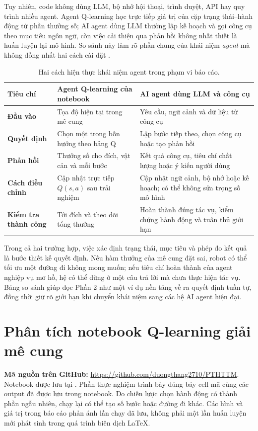 \documentclass[12pt,a4paper]{report}
\begin{document}
Tuy nhiên, code không dùng LLM, bộ nhớ hội thoại, trình duyệt, API hay quy trình
nhiều agent. Agent Q-learning học trực tiếp giá trị của cặp trạng thái--hành động từ
phần thưởng số; AI agent dùng LLM thường lập kế hoạch và gọi công cụ theo mục tiêu
ngôn ngữ, còn việc cải thiện qua phản hồi không nhất thiết là huấn luyện lại mô hình.
So sánh này làm rõ phần chung của khái niệm \emph{agent} mà không đồng nhất hai cách
cài đặt \cite{google,ibm,mckinsey}.

\begin{table}[H]
\centering
\small
\caption{Hai cách hiện thực khái niệm agent trong phạm vi báo cáo.}
\begin{tabularx}{\textwidth}{>{\bfseries}p{2.9cm}XX}
\toprule
Tiêu chí & Agent Q-learning của notebook & AI agent dùng LLM và công cụ \\
\midrule
Đầu vào & Tọa độ hiện tại trong mê cung & Yêu cầu, ngữ cảnh và dữ liệu từ công cụ \\
Quyết định & Chọn một trong bốn hướng theo bảng Q & Lập bước tiếp theo, chọn công cụ hoặc tạo phản hồi \\
Phản hồi & Thưởng số cho đích, vật cản và mỗi bước & Kết quả công cụ, tiêu chí chất lượng hoặc ý kiến người dùng \\
Cách điều chỉnh & Cập nhật trực tiếp $Q(s,a)$ sau trải nghiệm & Cập nhật ngữ cảnh, bộ nhớ hoặc kế hoạch; có thể không sửa trọng số mô hình \\
Kiểm tra thành công & Tới đích và theo dõi tổng thưởng & Hoàn thành đúng tác vụ, kiểm chứng hành động và tuân thủ giới hạn \\
\bottomrule
\end{tabularx}
\end{table}

Trong cả hai trường hợp, việc xác định trạng thái, mục tiêu và phép đo kết quả là
bước thiết kế quyết định. Nếu hàm thưởng của mê cung đặt sai, robot có thể tối ưu
một đường đi không mong muốn; nếu tiêu chí hoàn thành của agent nghiệp vụ mơ hồ,
hệ có thể dừng ở một câu trả lời mà chưa thực hiện tác vụ. Bảng so sánh giúp đọc
Phần 2 như một ví dụ nền tảng về ra quyết định tuần tự, đồng thời giữ rõ giới hạn
khi chuyển khái niệm sang các hệ AI agent hiện đại.

\clearpage
{}

\chapter{Phân tích notebook Q-learning giải mê cung}
\label{chap:notebook}
\noindent\textbf{Mã nguồn trên GitHub:} \url{https://github.com/duongthang2710/PTHTTM}.
Notebook được lưu tại . Phần thực nghiệm
trình bày đúng bảy cell mã cùng các output đã được lưu trong notebook. Do chiến lược
chọn hành động có thành phần ngẫu nhiên, chạy lại có thể tạo số bước hoặc đường đi khác.
Các hình và giá trị trong báo cáo phản ánh lần chạy đã lưu, không phải một lần huấn
luyện mới phát sinh trong quá trình biên dịch LaTeX.
\end{document}
